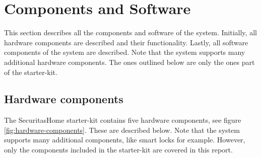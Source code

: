 \section{Components and Software} \label{ch:system:components}
This section describes all the components and software of the system. Initially, all hardware components are described and their functionality. Lastly, all software components of the system are described. Note that the system supports many additional hardware components. The ones outlined below are only the ones part of the starter-kit.

\subsection{Hardware components} \label{ch:system:hardware}
The SecuritasHome starter-kit contains five hardware components, see figure \ref{fig:hardware-components}. These are described below. Note that the system supports many additional components, like smart locks for example. However, only the components included in the starter-kit are covered in this report.
